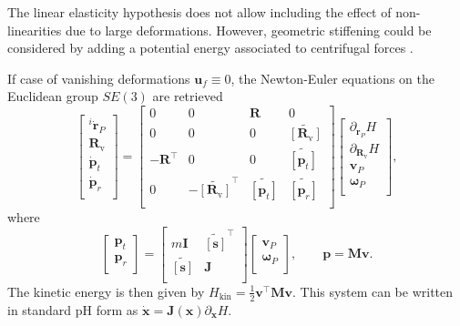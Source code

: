 \documentclass{svjour3}                     %
\newcommand{\crmat}[1]{\ensuremath{\widetilde{\left[#1\right]}}}
\begin{document}
\begin{remark}
	The linear elasticity hypothesis does not allow including the effect of non-linearities due to large deformations.  However, geometric stiffening could be considered by adding a potential energy associated to centrifugal forces \cite{MB_Daepde}. 
\end{remark}

\begin{remark}
	If case of vanishing deformations $\bm{u}_f \equiv 0$, the Newton-Euler equations on the Euclidean group $SE(3)$ are retrieved \cite{celledoni2018passivity}
	\begin{equation*}
	\begin{bmatrix}
	^i\dot{\bm{r}}_P \\ \bm{R}_{\text{v}} \\\dot{\bm{p}}_t \\ \dot{\bm{p}}_r \\
	\end{bmatrix} = 
	\begin{bmatrix}
	0 & 0 & \bm{R} & 0 \\
	0 & 0 & 0 & \crmat{\bm{R}_{\text{v}}} \\
	- \bm{R}^\top & 0 & 0 & \crmat{\bm{p}_t}\\
	0 & -\crmat{\bm{R}_{\text{v}}}^\top & \crmat{\bm{p}_t} & \crmat{\bm{p}_r} \\
	\end{bmatrix}
	\begin{bmatrix}
	\partial_{\bm{r}_P} H \\ \partial_{\bm{R}_{\text{v}}} H \\ \bm{v}_P \\ \bm{\omega}_P  \\
	\end{bmatrix},
	\end{equation*}
	where
	\begin{equation*}
	\begin{bmatrix}
	\bm{p}_t \\ \bm{p}_r \\ 
	\end{bmatrix} = 
	\begin{bmatrix}
	m \bm{I} & \crmat{\bm{s}}^\top \\
	\crmat{\bm{s}} & \bm{J} \\
	\end{bmatrix}
	\begin{bmatrix}
	\bm{v}_P \\ \bm{\omega}_P  \\ 
	\end{bmatrix}, \qquad \bm{p} = \bm{M} \bm{v}.
	\end{equation*}
	The kinetic energy is then given by $H_{\text{kin}} = \frac{1}{2} \bm{v}^\top \bm{M} \bm{v}$.
	This system can be written in standard pH form as $\dot{\bm{x}} = \bm{J}(\bm{x})\partial_{\bm{x}} H$.
\end{remark}
\end{document}
